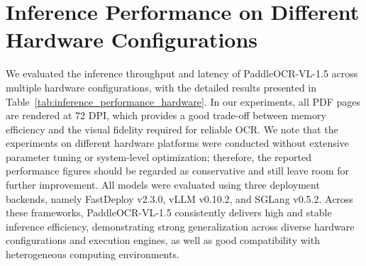 \documentclass[11pt, a4paper,logo,  copyright, nonumbering]{paddleocr}
\begin{document}
\clearpage 
\newpage

\section{Inference Performance on Different Hardware Configurations}

We evaluated the inference throughput and latency of PaddleOCR-VL-1.5 across multiple hardware configurations, with the detailed results presented in Table~\ref{tab:inference_performance_hardware}. In our experiments, all PDF pages are rendered at 72 DPI, which provides a good trade-off between memory efficiency and the visual fidelity required for reliable OCR. We note that the experiments on different hardware platforms were conducted without extensive parameter tuning or system-level optimization; therefore, the reported performance figures should be regarded as conservative and still leave room for further improvement. All models were evaluated using three deployment backends, namely FastDeploy v2.3.0, vLLM v0.10.2, and SGLang v0.5.2. Across these frameworks, PaddleOCR-VL-1.5 consistently delivers high and stable inference efficiency, demonstrating strong generalization across diverse hardware configurations and execution engines, as well as good compatibility with heterogeneous computing environments.
\end{document}
